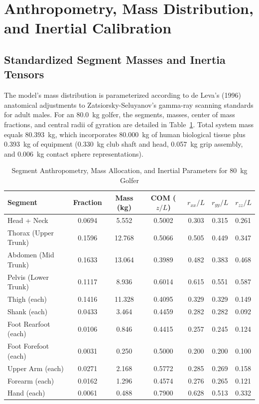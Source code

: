 \documentclass[11pt,a4paper]{article}
\begin{document}
\section{Anthropometry, Mass Distribution, and Inertial Calibration}

\subsection{Standardized Segment Masses and Inertia Tensors}
The model's mass distribution is parameterized according to de Leva's (1996)~\cite{deLeva1996} anatomical adjustments to Zatsiorsky-Seluyanov's gamma-ray scanning standards for adult males. For an 80.0~kg golfer, the segments, masses, center of mass fractions, and central radii of gyration are detailed in Table~\ref{tab:de_leva_masses}. Total system mass equals $80.393$~kg, which incorporates 80.000~kg of human biological tissue plus 0.393~kg of equipment (0.330~kg club shaft and head, 0.057~kg grip assembly, and 0.006~kg contact sphere representations).

\begin{table}[!htb]
\centering
\small
\caption{Segment Anthropometry, Mass Allocation, and Inertial Parameters for 80~kg Golfer}
\label{tab:de_leva_masses}
\begin{tabularx}{\textwidth}{lcccccX}
\toprule
\textbf{Segment} & \textbf{Fraction} & \textbf{Mass (kg)} & \textbf{COM ($z/L$)} & \textbf{$r_{xx}/L$} & \textbf{$r_{yy}/L$} & \textbf{$r_{zz}/L$} \\
\midrule
Head + Neck & 0.0694 & 5.552 & 0.5002 & 0.303 & 0.315 & 0.261 \\
Thorax (Upper Trunk) & 0.1596 & 12.768 & 0.5066 & 0.505 & 0.449 & 0.347 \\
Abdomen (Mid Trunk) & 0.1633 & 13.064 & 0.3989 & 0.482 & 0.383 & 0.468 \\
Pelvis (Lower Trunk) & 0.1117 & 8.936 & 0.6014 & 0.615 & 0.551 & 0.587 \\
Thigh (each) & 0.1416 & 11.328 & 0.4095 & 0.329 & 0.329 & 0.149 \\
Shank (each) & 0.0433 & 3.464 & 0.4459 & 0.282 & 0.282 & 0.092 \\
Foot Rearfoot (each) & 0.0106 & 0.846 & 0.4415 & 0.257 & 0.245 & 0.124 \\
Foot Forefoot (each) & 0.0031 & 0.250 & 0.5000 & 0.200 & 0.200 & 0.100 \\
Upper Arm (each) & 0.0271 & 2.168 & 0.5772 & 0.285 & 0.269 & 0.158 \\
Forearm (each) & 0.0162 & 1.296 & 0.4574 & 0.276 & 0.265 & 0.121 \\
Hand (each) & 0.0061 & 0.488 & 0.7900 & 0.628 & 0.513 & 0.332 \\
\bottomrule
\end{tabularx}
\end{table}
\end{document}
